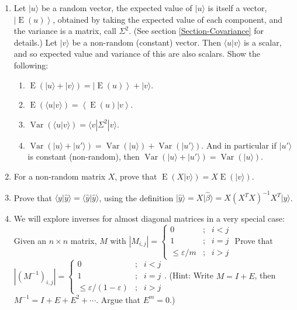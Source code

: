 \documentclass{amsbook}
\begin{document}
\begin{enumerate}
\item\label{random-constant} Let $|u\rangle$ be a random vector, the expected value of $|u\rangle$ is itself a vector, $\left|\operatorname{E}(u)\right\rangle$, obtained by taking the expected value of each component, and the variance is a matrix, call $\Sigma^2$.  (See section \ref{Section-Covariance} for details.)  Let $|v\rangle$ be a non-random (constant) vector.  Then $\langle u|v\rangle$ is a scalar, and so expected value and variance of this are also scalars.  Show the following:
\begin{enumerate}[a]
  \item $\operatorname{E}\left(|u\rangle+|v\rangle\right)=\left|\operatorname{E}(u)\right\rangle+|v\rangle$.
  \item $\operatorname{E}\left(\langle u|v\rangle\right)=\left\langle\operatorname{E}(u)|v\right\rangle$.
  \item $\operatorname{Var}\left(\langle u|v\rangle\right)=\langle v|\Sigma^2|v\rangle$.
  \item $\operatorname{Var}\left(|u\rangle+|u'\rangle\right)=\operatorname{Var}(|u\rangle)+\operatorname{Var}(|u'\rangle)$.  And in particular if $|u'\rangle$ is constant (non-random), then $\operatorname{Var}\left(|u\rangle+|u'\rangle\right)=\operatorname{Var}(|u\rangle)$.
\end{enumerate}
\item\label{random-constant-2} For a non-random matrix $X$, prove that $\operatorname{E}\left(X|v\rangle\right)=X\operatorname{E}\left(|v\rangle\right)$.
\item\label{y-hat-ex-1} Prove that $\langle y|\hat y\rangle=\langle \hat y|\hat y\rangle$, using the definition $|\hat y\rangle=X|\hat\beta\rangle=X\left(X^TX\right)^{-1}X^T|y\rangle$.
\item We will explore inverses for almost diagonal matrices in a very special case:  Given an $n\times n$ matrix, $M$ with $\left|M_{i,j}\right|=\left\{\begin{array}{rcl} 0&;&i<j\\1&;&i=j\\\leq\varepsilon/m &;&i>j\end{array}\right.$  Prove that $\left|\left(M^{-1}\right)_{i,j}\right|=\left\{\begin{array}{rcl} 0&;&i<j\\1&;&i=j\\\leq\varepsilon/\left(1-\varepsilon\right) &;&i>j\end{array}\right.$.  (Hint: Write $M=I+E$, then $M^{-1}=I+E+E^2+\cdots$.  Argue that $E^m=0$.)

\end{enumerate}
\end{document}

